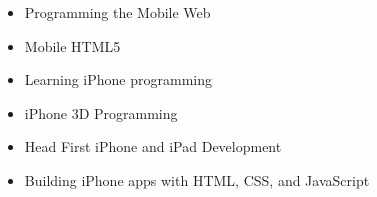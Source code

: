 \documentclass{article}
\begin{document}
\begin{itemize}
	\item Programming the Mobile Web \cite{firtman_programming_2013}
	\item  Mobile HTML5 \cite{weyl_mobile_2014}
	\item  Learning iPhone programming \cite{allan_learning_2010}
	\item  iPhone 3D Programming \cite{rideout_iphone_2010}
	\item  Head First iPhone and iPad Development \cite{pilone_head_2014}
	\item  Building iPhone apps with HTML, CSS, and JavaScript \cite{stark_building_2010}
\end{itemize}








\end{document}
